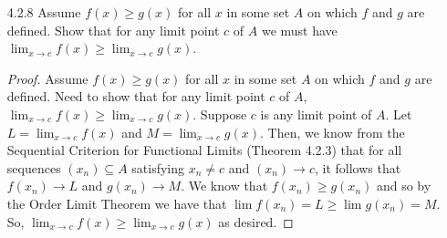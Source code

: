\documentclass[12pt,letterpaper]{article}
\begin{document}
\begin{itemize}[leftmargin=!,labelindent=5pt]
\begin{itemize}
                    An example of such a limit would be $f(x) = x$ because $\lim_{x\to\infty} x = \infty$.

                    \begin{proof}
                        Suppose $N > 0$.
                        Need that there exists a $D > 0$ such that whenever $x \in A$ and $x > D$, it follows that $f(x) = x > N$.
                        Choose $D = N$.
                        Then, whenever $x \in A$ and $x > D$, it follows that $x > N$ as desired.
                    \end{proof}
            \end{itemize}
        \item [4.2.8] Assume $f(x) \geq g(x)$ for all $x$ in some set $A$ on which $f$ and $g$ are defined. Show that for any limit point $c$ of $A$ we must have $\lim_{x \to c} f(x) \geq \lim_{x \to c} g(x)$.
            \begin{proof}
                Assume $f(x) \geq g(x)$ for all $x$ in some set $A$ on which $f$ and $g$ are defined.
                Need to show that for any limit point $c$ of $A$, $\lim_{x \to c} f(x) \geq \lim_{x \to c} g(x)$.
                Suppose $c$ is any limit point of $A$.
                Let $ L = \lim_{x \to c} f(x)$ and $M = \lim_{x \to c} g(x)$.
                Then, we know from the Sequential Criterion for Functional Limits (Theorem 4.2.3) that for all sequences $(x_n) \subseteq A$ satisfying $x_n \neq c$ and $(x_n) \to c$, it follows that $f(x_n) \to L$ and $g(x_n) \to M$.
                We know that $f(x_n) \geq g(x_n)$ and so by the Order Limit Theorem we have that $\lim f(x_n) = L \geq \lim g(x_n) = M$.
                So, $\lim_{x \to c} f(x) \geq \lim_{x \to c} g(x)$ as desired.
            \end{proof}
    \end{itemize}
\end{document}
